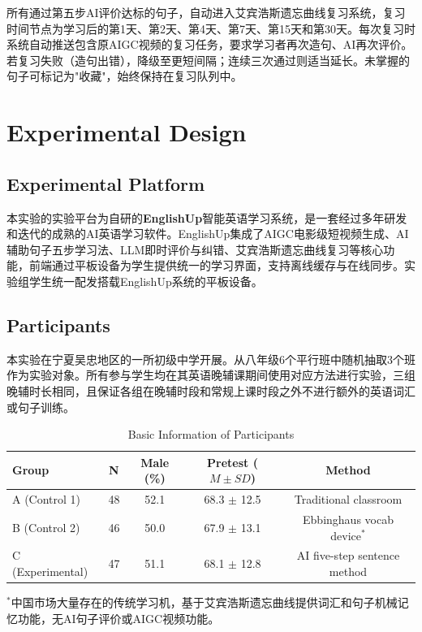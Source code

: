 \documentclass[12pt,a4paper]{ctexart}
\begin{document}
所有通过第五步AI评价达标的句子，自动进入艾宾浩斯遗忘曲线复习系统，复习时间节点为学习后的第1天、第2天、第4天、第7天、第15天和第30天。每次复习时系统自动推送包含原AIGC视频的复习任务，要求学习者再次造句、AI再次评价。若复习失败（造句出错），降级至更短间隔；连续三次通过则适当延长。未掌握的句子可标记为"收藏"，始终保持在复习队列中。


\section{Experimental Design}  %

\subsection{Experimental Platform}
本实验的实验平台为自研的\textbf{EnglishUp}智能英语学习系统，是一套经过多年研发和迭代的成熟的AI英语学习软件。EnglishUp集成了AIGC电影级短视频生成、AI辅助句子五步学习法、LLM即时评价与纠错、艾宾浩斯遗忘曲线复习等核心功能，前端通过平板设备为学生提供统一的学习界面，支持离线缓存与在线同步。实验组学生统一配发搭载EnglishUp系统的平板设备。

\subsection{Participants}
本实验在宁夏吴忠地区的一所初级中学开展。从八年级6个平行班中随机抽取3个班作为实验对象。所有参与学生均在其英语晚辅课期间使用对应方法进行实验，三组晚辅时长相同，且保证各组在晚辅时段和常规上课时段之外不进行额外的英语词汇或句子训练。

\begin{table}[H]
\centering
\small
\caption{Basic Information of Participants}
\begin{tabular}{lcccc}
\toprule
\textbf{Group} & \textbf{N} & \textbf{Male (\%)} & \textbf{Pretest ($M \pm SD$)} & \textbf{Method} \\
\midrule
A (Control 1) & 48 & 52.1 & 68.3 $\pm$ 12.5 & Traditional classroom \\
B (Control 2) & 46 & 50.0 & 67.9 $\pm$ 13.1 & Ebbinghaus vocab device$^*$ \\
C (Experimental) & 47 & 51.1 & 68.1 $\pm$ 12.8 & AI five-step sentence method \\
\bottomrule
\end{tabular}

\vspace{2pt}\small $^*$中国市场大量存在的传统学习机，基于艾宾浩斯遗忘曲线提供词汇和句子机械记忆功能，无AI句子评价或AIGC视频功能。
\end{table}
\end{document}
